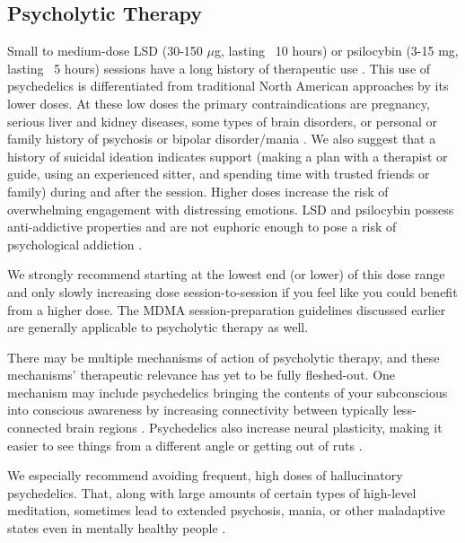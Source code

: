 \documentclass[12pt,letterpaper]{book}
\begin{document}
\subsection{Psycholytic Therapy}
\label{psychedelics}
Small to medium-dose LSD (30-150 $\mu$g, lasting ~10 hours) or psilocybin (3-15 mg, lasting ~5 hours) sessions have a long history of therapeutic use \cite{passiePsycholytic}. This use of psychedelics is differentiated from traditional North American approaches by its lower doses. At these low doses the primary contraindications are pregnancy, serious liver and kidney diseases, some types of brain disorders, or personal or family history of psychosis or bipolar disorder/mania \cite{schlagPsychedelicAdverseEffects,passiePsycholytic}. We also suggest that a history of suicidal ideation indicates support (making a plan with a therapist or guide, using an experienced sitter, and spending time with trusted friends or family) during and after the session. Higher doses increase the risk of overwhelming engagement with distressing emotions. LSD and psilocybin possess anti-addictive properties and are not euphoric enough to pose a risk of psychological addiction \cite{principeAddiction}.

We strongly recommend starting at the lowest end (or lower) of this dose range and only slowly increasing dose session-to-session if you feel like you could benefit from a higher dose. The MDMA session-preparation guidelines discussed earlier are generally applicable to psycholytic therapy as well.

There may be multiple mechanisms of action of psycholytic therapy, and these mechanisms' therapeutic relevance has yet to be fully fleshed-out. One mechanism may include psychedelics bringing the contents of your subconscious into conscious awareness by increasing connectivity between typically less-connected brain regions \cite{linguiti2023functional}. Psychedelics also increase neural plasticity, making it easier to see things from a different angle or getting out of ruts \cite{nardou2023psychedelics}. 

We especially recommend avoiding frequent, high doses of hallucinatory psychedelics. That, along with large amounts of certain types of high-level meditation, sometimes lead to extended psychosis, mania, or other maladaptive states even in mentally healthy people \cite{ingram2018mastering}.
\end{document}
